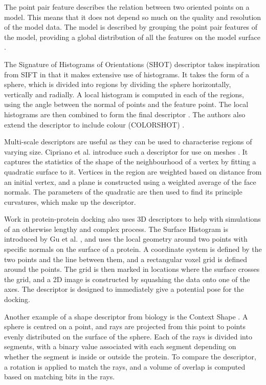 \documentclass[10pt,a4paper]{article}
\begin{document}
The point pair feature describes the relation between two oriented points on a
model. This means that it does not depend so much on the quality and resolution
of the model data. The model is described by grouping the point pair features of
the model, providing a global distribution of all the features on the model
surface \cite{drost2010model}. 

The Signature of Histograms of Orientations (SHOT) descriptor takes inspiration
from SIFT in that it makes extensive use of histograms. It takes the form of a
sphere, which is divided into regions by dividing the sphere horizontally,
vertically and radially. A local histogram is computed in each of the regions,
using the angle between the normal of points and the feature point. The local
histograms are then combined to form the final
descriptor \cite{tombari2010unique}. The authors also extend the descriptor to
include colour (COLORSHOT) \cite{tombari2011combined}.

Multi-scale descriptors are useful as they can be used to characterise regions
of varying size. Cipriano et al. introduce such a descriptor for use on meshes
\cite{cipriano2009multi}. It captures the statistics of the shape of the
neighbourhood of a vertex by fitting a quadratic surface to it. Vertices in the
region are weighted based on distance from an initial vertex, and a plane is
constructed using a weighted average of the face normals. The parameters of the
quadratic are then used to find its principle curvatures, which make up the
descriptor.

Work in protein-protein docking also uses 3D descriptors to help with
simulations of an otherwise lengthy and complex process. The Surface Histogram
is introduced by Gu et al. \cite{gu2012surface}, and uses the local geometry
around two points with specific normals on the surface of a protein. A
coordinate system is defined by the two points and the line between them, and a
rectangular voxel grid is defined around the points. The grid is then marked in
locations where the surface crosses the grid, and a 2D image is constructed by
squashing the data onto one of the axes. The descriptor is designed to
immediately give a potential pose for the docking.

Another example of a shape descriptor from biology is the Context Shape
\cite{shentu2008context}. A sphere is centred on a point, and rays are projected
from this point to points evenly distributed on the surface of the sphere. Each
of the rays is divided into segments, with a binary value associated with each
segment depending on whether the segment is inside or outside the protein. To
compare the descriptor, a rotation is applied to match the rays, and a volume of
overlap is computed based on matching bits in the rays.
 
\end{document}
